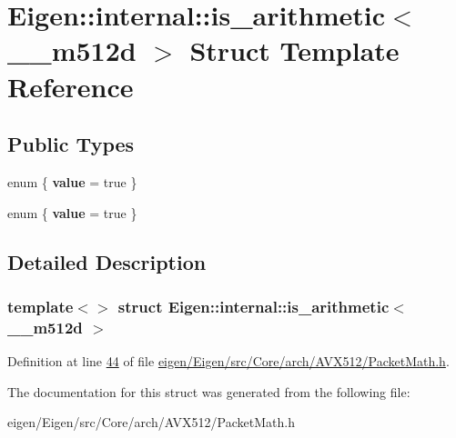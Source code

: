 \hypertarget{struct_eigen_1_1internal_1_1is__arithmetic_3_01____m512d_01_4}{}\section{Eigen\+:\+:internal\+:\+:is\+\_\+arithmetic$<$ \+\_\+\+\_\+m512d $>$ Struct Template Reference}
\label{struct_eigen_1_1internal_1_1is__arithmetic_3_01____m512d_01_4}
\subsection*{Public Types}
\begin{DoxyCompactItemize}
\item 
\mbox{\label{struct_eigen_1_1internal_1_1is__arithmetic_3_01____m512d_01_4_aab5cca92c07eb801c63af5ee4257dc1d}} 
enum \{ {\bfseries value} = true
 \}
\item 
\mbox{\label{struct_eigen_1_1internal_1_1is__arithmetic_3_01____m512d_01_4_a6473fa9e46d46af1ab69507d1ca18679}} 
enum \{ {\bfseries value} = true
 \}
\end{DoxyCompactItemize}


\subsection{Detailed Description}
\subsubsection*{template$<$$>$\newline
struct Eigen\+::internal\+::is\+\_\+arithmetic$<$ \+\_\+\+\_\+m512d $>$}



Definition at line \hyperlink{eigen_2_eigen_2src_2_core_2arch_2_a_v_x512_2_packet_math_8h_source_l00044}{44} of file \hyperlink{eigen_2_eigen_2src_2_core_2arch_2_a_v_x512_2_packet_math_8h_source}{eigen/\+Eigen/src/\+Core/arch/\+A\+V\+X512/\+Packet\+Math.\+h}.



The documentation for this struct was generated from the following file\+:\begin{DoxyCompactItemize}
\item 
eigen/\+Eigen/src/\+Core/arch/\+A\+V\+X512/\+Packet\+Math.\+h\end{DoxyCompactItemize}
